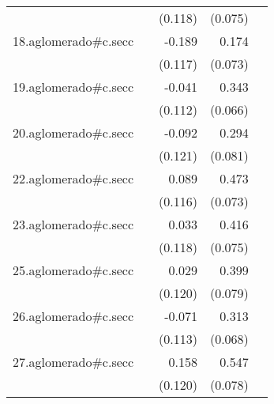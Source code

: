 {\begin{longtable}{l*{4}{D{.}{.}{-1}}}
            &                     &     (0.118)         &     (0.075)         &                     \\
\addlinespace
18.aglomerado#c.secc&                     &      -0.189         &       0.174\sym{*}  &                     \\
            &                     &     (0.117)         &     (0.073)         &                     \\
\addlinespace
19.aglomerado#c.secc&                     &      -0.041         &       0.343\sym{***}&                     \\
            &                     &     (0.112)         &     (0.066)         &                     \\
\addlinespace
20.aglomerado#c.secc&                     &      -0.092         &       0.294\sym{***}&                     \\
            &                     &     (0.121)         &     (0.081)         &                     \\
\addlinespace
22.aglomerado#c.secc&                     &       0.089         &       0.473\sym{***}&                     \\
            &                     &     (0.116)         &     (0.073)         &                     \\
\addlinespace
23.aglomerado#c.secc&                     &       0.033         &       0.416\sym{***}&                     \\
            &                     &     (0.118)         &     (0.075)         &                     \\
\addlinespace
25.aglomerado#c.secc&                     &       0.029         &       0.399\sym{***}&                     \\
            &                     &     (0.120)         &     (0.079)         &                     \\
\addlinespace
26.aglomerado#c.secc&                     &      -0.071         &       0.313\sym{***}&                     \\
            &                     &     (0.113)         &     (0.068)         &                     \\
\addlinespace
27.aglomerado#c.secc&                     &       0.158         &       0.547\sym{***}&                     \\
            &                     &     (0.120)         &     (0.078)         &                     \\

\end{longtable}}
